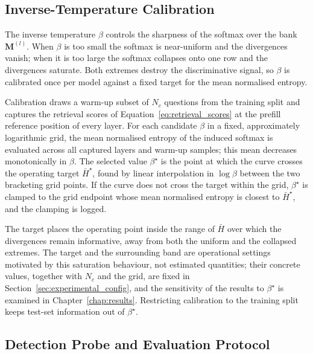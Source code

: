 \subsection{Inverse-Temperature Calibration}
\label{subsec:beta_calibration}

The inverse temperature $\beta$ controls the sharpness of the softmax over
the bank $\mathbf{M}^{(l)}$. When $\beta$ is too small the softmax is
near-uniform and the divergences vanish; when it is too large the softmax
collapses onto one row and the divergences saturate. Both extremes destroy
the discriminative signal, so $\beta$ is calibrated once per model against
a fixed target for the mean normalised entropy.

Calibration draws a warm-up subset of $N_c$ questions from the training
split and captures the retrieval scores of
Equation~\eqref{eq:retrieval_scores} at the prefill reference position of
every layer. For each candidate $\beta$ in a fixed, approximately
logarithmic grid, the
mean normalised entropy of the induced softmax is evaluated across all
captured layers and warm-up samples; this mean decreases monotonically in
$\beta$. The selected value $\beta^\star$ is the point at which the curve
crosses the operating target $\bar{H}^\star$, found by linear interpolation
in $\log \beta$ between the two bracketing grid points. If the curve does
not cross the target within the grid, $\beta^\star$ is clamped to the grid
endpoint whose mean normalised entropy is closest to $\bar{H}^\star$, and
the clamping is logged.

The target places the operating point inside the range of $\bar{H}$ over
which the divergences remain informative, away from both the uniform and
the collapsed extremes. The target and the surrounding band are operational
settings motivated by this saturation behaviour, not estimated quantities;
their concrete values, together with $N_c$ and the grid, are fixed in
Section~\ref{sec:experimental_config}, and the sensitivity of the results
to $\beta^\star$ is examined in Chapter~\ref{chap:results}. Restricting
calibration to the training split keeps test-set information out of
$\beta^\star$.

\subsection{Detection Probe and Evaluation Protocol}
\label{subsec:probe}

